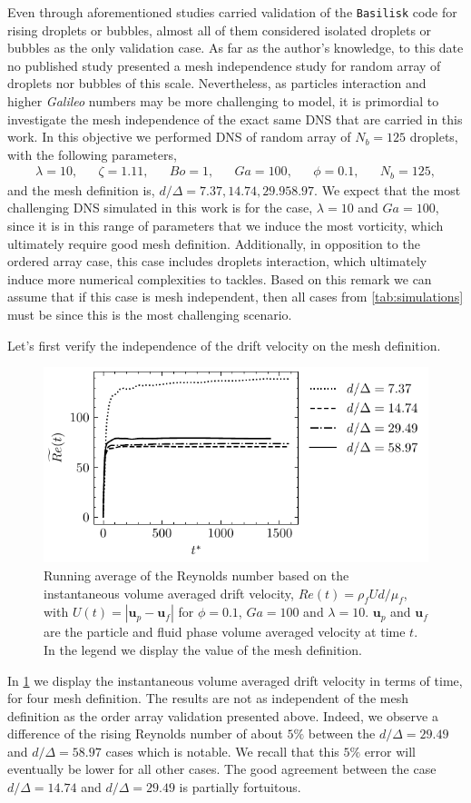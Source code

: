Even through aforementioned studies carried validation of the \texttt{Basilisk} code for rising droplets or bubbles, almost all of them considered isolated droplets or bubbles as the only validation case. 
As far as the author's knowledge, to this date no published study presented a mesh independence study for random array of droplets nor bubbles of this scale. 
Nevertheless, as particles interaction and higher \textit{Galileo} numbers may be more challenging to model, it is primordial to investigate the mesh independence of the exact same DNS that are carried in this work. 
In this objective we performed DNS of random array of $N_b=125$ droplets, with the following parameters,
\begin{align*}
    \lambda = 10,
    && \zeta = 1.11,
    && Bo = 1,
    && Ga = 100,
    && \phi = 0.1,
    && N_b =125,
\end{align*}
and the mesh definition is, $d/\Delta = 7.37, 14.74, 29.9 58.97$. 
We expect that the most challenging DNS simulated in this work is for the case, $\lambda = 10$ and $Ga = 100$, since it is in this range of parameters that we induce the most vorticity, which ultimately require good mesh definition. 
Additionally, in opposition to the ordered array case, this case includes droplets interaction, which ultimately induce more numerical complexities to tackles. 
Based on this remark we can assume that if this case is mesh independent, then all cases from \ref{tab:simulations} must be since this is the most challenging scenario.   

Let's first verify the independence of the drift velocity on the mesh definition. 
\begin{figure}[h!]
    \centering
    \includegraphics[height = 0.3\textwidth]{image/HOMOGENEOUS_NEW/VAL/Re.pdf}
    \caption{
        Running average of the Reynolds number based on the instantaneous volume averaged drift velocity, $Re(t) = \rho_fU d /\mu_f$, with $U(t) = |\textbf{u}_p - \textbf{u}_f|$ for $\phi = 0.1$, $Ga=100$ and $\lambda =10$.
        $\textbf{u}_p$ and $\textbf{u}_f$ are the particle and fluid phase volume averaged velocity at time $t$.
        In the legend we display the value of the mesh definition. 
    }
    \label{fig:Re}
\end{figure}
In \ref{fig:Re} we display the instantaneous volume averaged drift velocity in terms of time, for four mesh definition. 
The results are not as independent of the mesh definition as the order array validation presented above. 
Indeed, we observe a difference of the rising Reynolds number of about $5\%$ between the $d/\Delta = 29.49$ and $d/\Delta = 58.97$ cases which is notable.
We recall that this $5\%$ error will eventually be lower for all other cases. 
The good agreement between the case  $d/\Delta = 14.74$ and $d/\Delta = 29.49$ is partially fortuitous.

